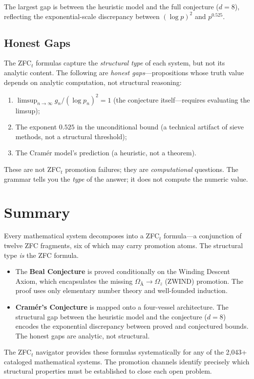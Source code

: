 \documentclass[12pt]{article}
\begin{document}
The largest gap is between the heuristic model and the full conjecture
($d=8$), reflecting the exponential-scale discrepancy between
$(\log p)^2$ and $p^{0.525}$.

\subsection{Honest Gaps}

The ZFC${}_t$ formulas capture the \emph{structural type} of each
system, but not its analytic content. The following are
\emph{honest gaps}---propositions whose truth value depends on
analytic computation, not structural reasoning:

\begin{enumerate}
\item $\limsup_{n\to\infty} g_n/(\log p_n)^2 = 1$ (the conjecture
      itself---requires evaluating the limsup);
\item The exponent $0.525$ in the unconditional bound (a technical
      artifact of sieve methods, not a structural threshold);
\item The Cram\'er model's prediction (a heuristic, not a theorem).
\end{enumerate}

These are not ZFC${}_t$ promotion failures; they are
\emph{computational} questions. The grammar tells you the
\emph{type} of the answer; it does not compute the numeric value.

\section{Summary}

Every mathematical system decomposes into a ZFC${}_t$ formula---a
conjunction of twelve ZFC fragments, six of which may carry
promotion atoms. The structural type \emph{is} the ZFC formula.

\begin{itemize}
\item The \textbf{Beal Conjecture} is proved conditionally on the
      Winding Descent Axiom, which encapsulates the missing
      $\Omega_{\text{Å}}\to\Omega_z$ (ZWIND) promotion. The proof uses
      only elementary number theory and well-founded induction.
\item \textbf{Cram\'er's Conjecture} is mapped onto a four-vessel
      architecture. The structural gap between the heuristic model
      and the conjecture ($d=8$) encodes the exponential discrepancy
      between proved and conjectured bounds. The honest gaps are
      analytic, not structural.
\end{itemize}

The ZFC${}_t$ navigator provides these formulas systematically for
any of the 2,043+ cataloged mathematical systems. The promotion
channels identify precisely which structural properties must be
established to close each open problem.
\end{document}

